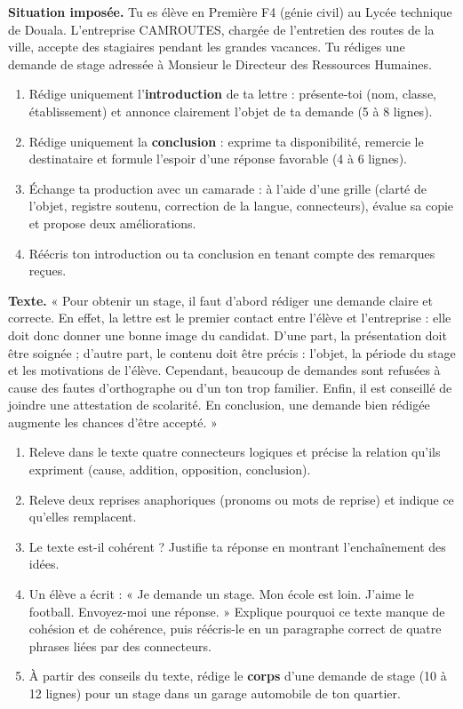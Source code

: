 \documentclass[11pt]{article}
\begin{document}
\begin{exercice}
\textbf{Situation imposée.} Tu es élève en Première F4 (génie civil) au Lycée technique de Douala. L'entreprise CAMROUTES, chargée de l'entretien des routes de la ville, accepte des stagiaires pendant les grandes vacances. Tu rédiges une demande de stage adressée à Monsieur le Directeur des Ressources Humaines.
\begin{enumerate}
\item Rédige uniquement l'\textbf{introduction} de ta lettre : présente-toi (nom, classe, établissement) et annonce clairement l'objet de ta demande (5 à 8 lignes).
\item Rédige uniquement la \textbf{conclusion} : exprime ta disponibilité, remercie le destinataire et formule l'espoir d'une réponse favorable (4 à 6 lignes).
\item Échange ta production avec un camarade : à l'aide d'une grille (clarté de l'objet, registre soutenu, correction de la langue, connecteurs), évalue sa copie et propose deux améliorations.
\item Réécris ton introduction ou ta conclusion en tenant compte des remarques reçues.
\end{enumerate}
\end{exercice}

\begin{exercice}
\textbf{Texte.} « Pour obtenir un stage, il faut d'abord rédiger une demande claire et correcte. En effet, la lettre est le premier contact entre l'élève et l'entreprise : elle doit donc donner une bonne image du candidat. D'une part, la présentation doit être soignée ; d'autre part, le contenu doit être précis : l'objet, la période du stage et les motivations de l'élève. Cependant, beaucoup de demandes sont refusées à cause des fautes d'orthographe ou d'un ton trop familier. Enfin, il est conseillé de joindre une attestation de scolarité. En conclusion, une demande bien rédigée augmente les chances d'être accepté. »
\begin{enumerate}
\item Releve dans le texte quatre connecteurs logiques et précise la relation qu'ils expriment (cause, addition, opposition, conclusion).
\item Releve deux reprises anaphoriques (pronoms ou mots de reprise) et indique ce qu'elles remplacent.
\item Le texte est-il cohérent ? Justifie ta réponse en montrant l'enchaînement des idées.
\item Un élève a écrit : « Je demande un stage. Mon école est loin. J'aime le football. Envoyez-moi une réponse. » Explique pourquoi ce texte manque de cohésion et de cohérence, puis réécris-le en un paragraphe correct de quatre phrases liées par des connecteurs.
\item À partir des conseils du texte, rédige le \textbf{corps} d'une demande de stage (10 à 12 lignes) pour un stage dans un garage automobile de ton quartier.
\end{enumerate}
\end{exercice}
\end{document}
